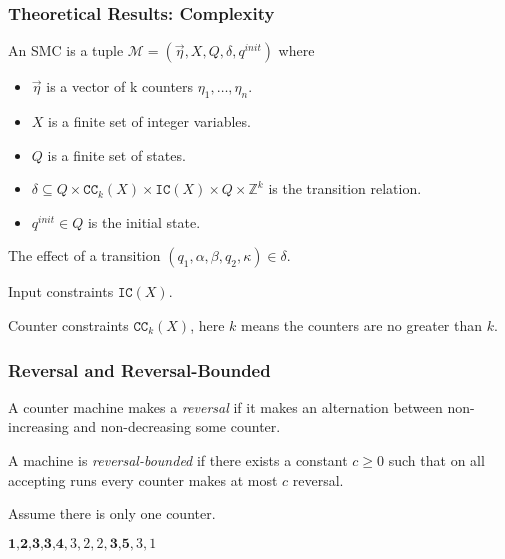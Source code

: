 \documentclass[11pt]{beamer}
\begin{document}
 \fi
\begin{frame}\frametitle{Theoretical Results: Complexity}
\begin{definition}

An SMC is a tuple $\mathcal{M} = (\vec{\eta}, X, Q, \delta, q^{init})$ where 
\begin{itemize}
\item $\vec{\eta}$ is a vector of k counters $\eta_1, \ldots,\eta_n$.
\item $X$ is a finite set of integer variables.
\item $Q$ is a finite set of states.

\item $\delta \subseteq Q\times \texttt{CC}_k(X) \times \texttt{IC}(X)\times Q\times \mathbb{Z}^k$ is the transition relation.

\item $q^{init} \in Q$ is the initial state.

\end{itemize}
\end{definition}
The effect of a transition $(q_1, \alpha, \beta, q_2, \kappa)\in \delta$. 

Input constraints $\texttt{IC}(X)$.

Counter constraints $\texttt{CC}_k(X)$, here $k$ means the counters are no greater than $k$.

\end{frame}

\begin{frame}\frametitle{Reversal and Reversal-Bounded}
\begin{definition}[Reversal]
A counter machine makes a \textit{reversal} if it makes an alternation between non-increasing and non-decreasing some counter.

A machine is \textit{reversal-bounded} if there exists a constant $c\ge 0$ such that on all accepting runs every counter makes at most $c$ reversal.
\end{definition}

\begin{example}
Assume there is only one counter.

$\textbf{1,2,3,3,4},3,2,2,\textbf{3,5},3,1$



\end{example}
\end{frame}
\end{document}
